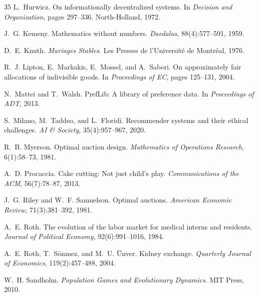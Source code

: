 \documentclass[10pt]{article}
\begin{document}
\begin{thebibliography}{35}
L.~Hurwicz.
\newblock On informationally decentralized systems.
\newblock In \emph{Decision and Organization}, pages 297--336. North-Holland, 1972.

J.~G. Kemeny.
\newblock Mathematics without numbers.
\newblock \emph{Daedalus}, 88(4):577--591, 1959.

D.~E. Knuth.
\newblock \emph{Mariages Stables}.
\newblock Les Presses de l'Universit\'{e} de Montr\'{e}al, 1976.

R.~J. Lipton, E.~Markakis, E.~Mossel, and A.~Saberi.
\newblock On approximately fair allocations of indivisible goods.
\newblock In \emph{Proceedings of EC}, pages 125--131, 2004.

N.~Mattei and T.~Walsh.
\newblock PrefLib: A library of preference data.
\newblock In \emph{Proceedings of ADT}, 2013.

S.~Milano, M.~Taddeo, and L.~Floridi.
\newblock Recommender systems and their ethical challenges.
\newblock \emph{AI \& Society}, 35(4):957--967, 2020.

R.~B. Myerson.
\newblock Optimal auction design.
\newblock \emph{Mathematics of Operations Research}, 6(1):58--73, 1981.

A.~D. Procaccia.
\newblock Cake cutting: Not just child's play.
\newblock \emph{Communications of the ACM}, 56(7):78--87, 2013.

J.~G. Riley and W.~F. Samuelson.
\newblock Optimal auctions.
\newblock \emph{American Economic Review}, 71(3):381--392, 1981.

A.~E. Roth.
\newblock The evolution of the labor market for medical interns and residents.
\newblock \emph{Journal of Political Economy}, 92(6):991--1016, 1984.

A.~E. Roth, T.~S\"{o}nmez, and M.~U. \"{U}nver.
\newblock Kidney exchange.
\newblock \emph{Quarterly Journal of Economics}, 119(2):457--488, 2004.

W.~H. Sandholm.
\newblock \emph{Population Games and Evolutionary Dynamics}.
\newblock MIT Press, 2010.


\end{thebibliography}
\end{document}
